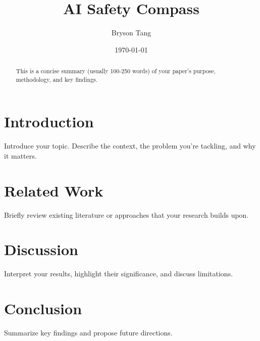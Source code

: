 \documentclass[11pt]{article}
\title{AI Safety Compass}
\author{Bryson Tang}
\date{\today}
\begin{document}
\maketitle

\begin{abstract}
This is a concise summary (usually 100-250 words) of your paper's purpose, methodology, and key findings.
\end{abstract}

\section{Introduction}
Introduce your topic. Describe the context, the problem you're tackling, and why it matters.

\section{Related Work}
Briefly review existing literature or approaches that your research builds upon.





\section{Discussion}
Interpret your results, highlight their significance, and discuss limitations.

\section{Conclusion}
Summarize key findings and propose future directions.

% 
% 
\end{document}
